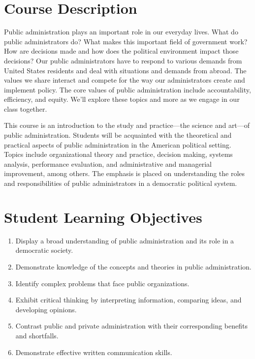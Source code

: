\documentclass[11pt, letterpaper]{article}
\begin{document}
\section{Course Description}

Public administration plays an important role in our everyday lives. What do public administrators do? What makes this important field of government work? How are decisions made and how does the political environment impact those decisions? Our public administrators have to respond to various demands from United States residents and deal with situations and demands from abroad. The values we share interact and compete for the way our administrators create and implement policy. The core values of public administration include accountability, efficiency, and equity. We'll explore these topics and more as we engage in our class together. 

\vspace*{1em}

\noindent This course is an introduction to the study and practice---the science and art---of public administration. Students will be acquainted with the theoretical and practical aspects of public administration in the American political setting. Topics include organizational theory and practice, decision making, systems analysis, performance evaluation, and administrative and managerial improvement, among others. The emphasis is placed on understanding the roles and responsibilities of public administrators in a democratic political system. 
	

\section{Student Learning Objectives}

\begin{enumerate}
    \item Display a broad understanding of public administration and its role in a democratic society. 

    \item Demonstrate knowledge of the concepts and theories in public administration. 
    
    \item Identify complex problems that face public organizations.

    \item Exhibit critical thinking by interpreting information, comparing ideas, and developing opinions. 
    
    \item Contrast public and private administration with their corresponding benefits and shortfalls. 

    \item Demonstrate effective written communication skills. 

\end{enumerate}
\end{document}
